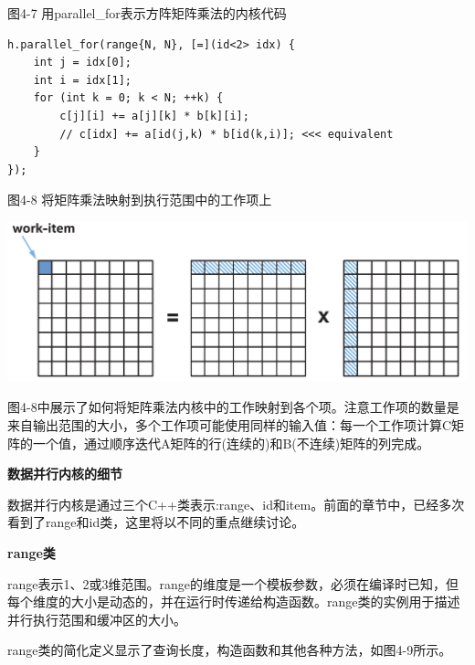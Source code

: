 \hspace*{\fill} \par %
图4-7 用parallel\_for表示方阵矩阵乘法的内核代码
\begin{lstlisting}[caption={}]
h.parallel_for(range{N, N}, [=](id<2> idx) {
	int j = idx[0];
	int i = idx[1];
	for (int k = 0; k < N; ++k) {
		c[j][i] += a[j][k] * b[k][i];
		// c[idx] += a[id(j,k) * b[id(k,i)]; <<< equivalent
	}
});
\end{lstlisting}

\hspace*{\fill} \par %
图4-8 将矩阵乘法映射到执行范围中的工作项上
\begin{center}
	\includegraphics[width=1.\textwidth]{content/chapter-4/images/4}
\end{center}

图4-8中展示了如何将矩阵乘法内核中的工作映射到各个项。注意工作项的数量是来自输出范围的大小，多个工作项可能使用同样的输入值：每一个工作项计算C矩阵的一个值，通过顺序迭代A矩阵的行(连续的)和B(不连续)矩阵的列完成。\par

\hspace*{\fill} \par %
\textbf{数据并行内核的细节}

数据并行内核是通过三个C++类表示:range、id和item。前面的章节中，已经多次看到了range和id类，这里将以不同的重点继续讨论。\par

\hspace*{\fill} \par %
\textbf{range类}

range表示1、2或3维范围。range的维度是一个模板参数，必须在编译时已知，但每个维度的大小是动态的，并在运行时传递给构造函数。range类的实例用于描述并行执行范围和缓冲区的大小。\par

range类的简化定义显示了查询长度，构造函数和其他各种方法，如图4-9所示。\par

